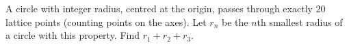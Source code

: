 A circle with integer radius, centred at the origin, passes through exactly $20$ lattice points (counting points on the axes). Let $r_n$ be the $n$th smallest radius of a circle with this property. Find $r_1+r_2+r_3$.
